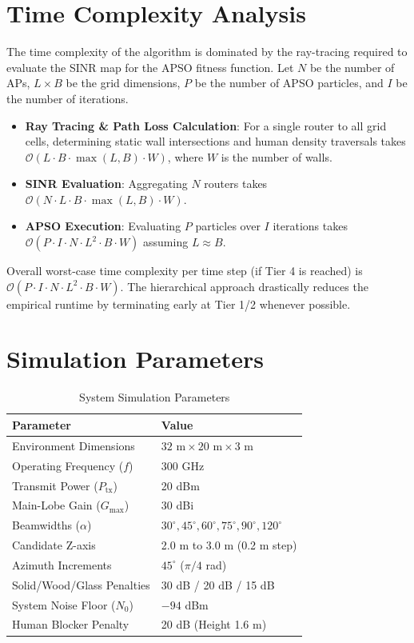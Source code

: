 \documentclass[10pt, a4paper]{article}
\begin{document}
\section{Time Complexity Analysis}
The time complexity of the algorithm is dominated by the ray-tracing required to evaluate the SINR map for the APSO fitness function.
Let $N$ be the number of APs, $L \times B$ be the grid dimensions, $P$ be the number of APSO particles, and $I$ be the number of iterations.
\begin{itemize}
    \item \textbf{Ray Tracing \& Path Loss Calculation}: For a single router to all grid cells, determining static wall intersections and human density traversals takes $\mathcal{O}(L \cdot B \cdot \max(L, B) \cdot W)$, where $W$ is the number of walls.
    \item \textbf{SINR Evaluation}: Aggregating $N$ routers takes $\mathcal{O}(N \cdot L \cdot B \cdot \max(L, B) \cdot W)$.
    \item \textbf{APSO Execution}: Evaluating $P$ particles over $I$ iterations takes $\mathcal{O}(P \cdot I \cdot N \cdot L^2 \cdot B \cdot W)$ assuming $L \approx B$.
\end{itemize}
Overall worst-case time complexity per time step (if Tier 4 is reached) is $\mathcal{O}(P \cdot I \cdot N \cdot L^2 \cdot B \cdot W)$. The hierarchical approach drastically reduces the empirical runtime by terminating early at Tier 1/2 whenever possible.

\section{Simulation Parameters}
\begin{table}[H]
    \centering
    \begin{tabular}{@{}ll@{}}
    \toprule
    \textbf{Parameter} & \textbf{Value} \\ \midrule
    Environment Dimensions & $32\text{ m} \times 20\text{ m} \times 3\text{ m}$ \\
    Operating Frequency ($f$) & 300 GHz \\
    Transmit Power ($P_{\text{tx}}$) & 20 dBm \\
    Main-Lobe Gain ($G_{\text{max}}$) & 30 dBi \\
    Beamwidths ($\alpha$) & $30^\circ, 45^\circ, 60^\circ, 75^\circ, 90^\circ, 120^\circ$ \\
    Candidate Z-axis & 2.0 m to 3.0 m (0.2 m step) \\
    Azimuth Increments & $45^\circ$ ($\pi/4$ rad) \\
    Solid/Wood/Glass Penalties & 30 dB / 20 dB / 15 dB \\
    System Noise Floor ($N_0$) & $-94$ dBm \\
    Human Blocker Penalty & 20 dB (Height 1.6 m) \\ \bottomrule
    \end{tabular}
    \caption{System Simulation Parameters}
\end{table}
\end{document}
